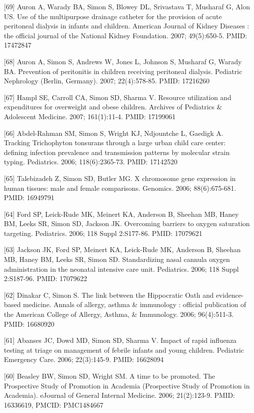 \documentclass[
  12pt,
]{article}
\begin{document}
{[}69{]} Auron A, Warady BA, Simon S, Blowey DL, Srivastava T, Musharaf
G, Alon US. Use of the multipurpose drainage catheter for the provision
of acute peritoneal dialysis in infants and children. American Journal
of Kidney Diseases : the official journal of the National Kidney
Foundation. 2007; 49(5):650-5. PMID: 17472847

{[}68{]} Auron A, Simon S, Andrews W, Jones L, Johnson S, Musharaf G,
Warady BA. Prevention of peritonitis in children receiving peritoneal
dialysis. Pediatric Nephrology (Berlin, Germany). 2007; 22(4):578-85.
PMID: 17216260

{[}67{]} Hampl SE, Carroll CA, Simon SD, Sharma V. Resource utilization
and expenditures for overweight and obese children. Archives of
Pediatrics \& Adolescent Medicine. 2007; 161(1):11-4. PMID: 17199061

{[}66{]} Abdel-Rahman SM, Simon S, Wright KJ, Ndjountche L, Gaedigk A.
Tracking Trichophyton tonsurans through a large urban child care center:
defining infection prevalence and transmission patterns by molecular
strain typing. Pediatrics. 2006; 118(6):2365-73. PMID: 17142520

{[}65{]} Talebizadeh Z, Simon SD, Butler MG. X chromosome gene
expression in human tissues: male and female comparisons. Genomics.
2006; 88(6):675-681. PMID: 16949791

{[}64{]} Ford SP, Leick-Rude MK, Meinert KA, Anderson B, Sheehan MB,
Haney BM, Leeks SR, Simon SD, Jackson JK. Overcoming barriers to oxygen
saturation targeting. Pediatrics. 2006; 118 Suppl 2:S177-86. PMID:
17079621

{[}63{]} Jackson JK, Ford SP, Meinert KA, Leick-Rude MK, Anderson B,
Sheehan MB, Haney BM, Leeks SR, Simon SD. Standardizing nasal cannula
oxygen administration in the neonatal intensive care unit. Pediatrics.
2006; 118 Suppl 2:S187-96. PMID: 17079622

{[}62{]} Dinakar C, Simon S. The link between the Hippocratic Oath and
evidence-based medicine. Annals of allergy, asthma \& immunology :
official publication of the American College of Allergy, Asthma, \&
Immunology. 2006; 96(4):511-3. PMID: 16680920

{[}61{]} Abanses JC, Dowd MD, Simon SD, Sharma V. Impact of rapid
influenza testing at triage on management of febrile infants and young
children. Pediatric Emergency Care. 2006; 22(3):145-9. PMID: 16628094

{[}60{]} Beasley BW, Simon SD, Wright SM. A time to be promoted. The
Prospective Study of Promotion in Academia (Prospective Study of
Promotion in Academia). eJournal of General Internal Medicine. 2006;
21(2):123-9. PMID: 16336619, PMCID: PMC1484667
\end{document}
